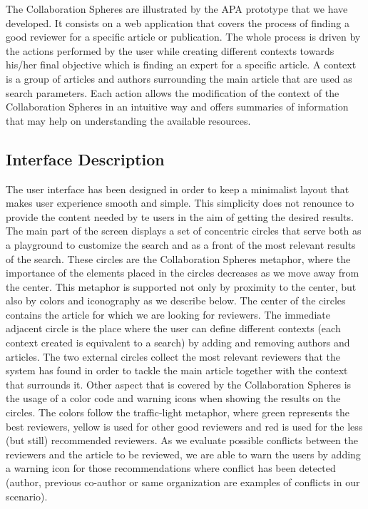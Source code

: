 The Collaboration Spheres are illustrated by the APA prototype that we have developed. It consists on a web application that covers the process of finding a good reviewer for a specific article or publication. The whole process is driven by the actions performed by the user while creating different contexts towards his/her final objective which is finding an expert for a specific article. A context is a group of articles and authors surrounding the main article that are used as search parameters. Each action allows the modification of the context of the Collaboration Spheres in an intuitive way and offers summaries of information that may help on understanding the available resources.\\
\subsection{Interface Description}
The user interface has been designed in order to keep a minimalist layout that makes user experience smooth and simple. This simplicity does not renounce to provide the content needed by te users in the aim of getting the desired results. The main part of the screen displays a set of concentric circles that serve both as a playground to customize the search and as a front of the most relevant results of the search. These circles are the Collaboration Spheres metaphor, where the importance of the elements placed in the circles decreases as we move away from the center. This metaphor is supported not only by proximity to the center, but also by colors and iconography as we describe below.
The center of the circles contains the article for which we are looking for reviewers. The immediate adjacent circle is the place where the user can define different contexts (each context created is equivalent to a search) by adding and removing authors and articles. The two external circles collect the most relevant reviewers that the system has found in order to tackle the main article together with the context that surrounds it.
Other aspect that is covered by the Collaboration Spheres is the usage of a color code and warning icons when showing the results on the circles. The colors follow the traffic-light metaphor, where green represents the best reviewers, yellow is used for other good reviewers and red is used for the less (but still) recommended reviewers. As we evaluate possible conflicts between the reviewers and the article to be reviewed, we are able to warn the users by adding a warning icon for those recommendations where conflict has been detected (author, previous co-author or same organization are examples of conflicts in our scenario). 

